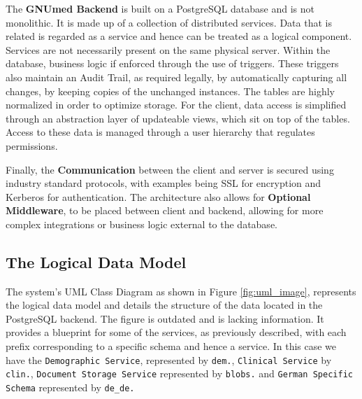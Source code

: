 \documentclass[10pt,onecolcolumn,letterpaper]{article}
\begin{document}
The \textbf{GNUmed Backend} is built on a PostgreSQL database and is not monolithic. It is made up of a collection of distributed services. Data that is related is regarded as a service and hence can be treated as a logical component. Services are not necessarily present on the same physical server. Within the database, business logic if enforced through the use of triggers. These triggers also maintain an Audit Trail, as required legally, by automatically capturing all changes, by keeping copies of the unchanged instances. The tables are highly normalized in order to optimize storage. For the client, data access is simplified through an abstraction layer of updateable views, which sit on top of the tables. Access to these data is managed through a user hierarchy that regulates permissions. 

Finally, the \textbf{Communication} between the client and server is secured using industry standard protocols, with examples being SSL for encryption and Kerberos for authentication. The architecture also allows for \textbf{Optional Middleware}, to be placed between client and backend, allowing for more complex integrations or business logic external to the database.

\subsection{The Logical Data Model}

The system's UML Class Diagram as shown in Figure \ref{fig:uml_image}, represents the logical data model and details the structure of the data located in the PostgreSQL backend. The figure is outdated and is lacking information. It provides a blueprint for some of the services, as previously described, with each prefix corresponding to a specific schema and hence a service. In this case we have the \texttt{Demographic Service}, represented by \texttt{dem.}, \texttt{Clinical Service} by \texttt{clin.}, \texttt{Document Storage Service} represented by \texttt{blobs.} and \texttt{German Specific Schema} represented by \texttt{de\_de.}
\end{document}
